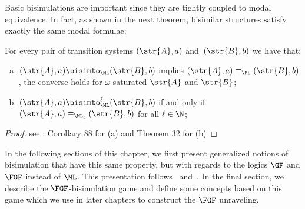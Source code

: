 \noindent
Basic bisimulations are important since they are tightly coupled to modal equivalence.
In fact, as shown in the next theorem, bisimilar structures satisfy exactly the same modal formulae:
\begin{lemma}\label{lemma:ML-bisimulations-work-well}
For every pair of transition systems $(\str{A}, a)$ and~$(\str{B}, b)$ we have that:
\begin{enumerate}[(a)]
\item $(\str{A}, a) \bisimto_{\ML} (\str{B}, b)$ implies $(\str{A}, a) \equiv_{\ML} (\str{B}, b)$, the converse holds for $\omega$-saturated $\str{A}$ and $\str{B}$;
\item $(\str{A}, a) \bisimto_{\ML}^{\ell} (\str{B}, b)$ if and only if $(\str{A}, a) \equiv_{\ML_\ell} (\str{B}, b)$ for all $\ell \in \N$;
\end{enumerate}
\end{lemma}
\begin{proof}
  see \cite{goranko2007}: Corollary 88 for (a) and Theorem 32 for (b)
\end{proof}
In the following sections of this chapter, we first present generalized notions of bisimulation that have this same property, but with regards to the logics $\GF$ and $\FGF$ instead of $\ML$.
This presentation follows~\cite[Sec. 2.2.3]{Otto04} and~\cite[Sec. 2]{BednarczykJ22}.
In the final section, we describe the $\FGF$-bisimulation game and define some concepts based on this game which we use in later chapters to construct the $\FGF$ unraveling.

